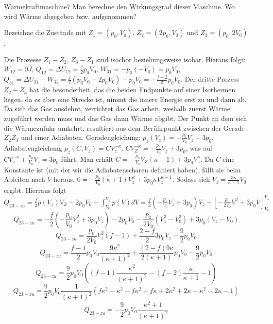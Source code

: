 \begin{problem}{Wärmekraftmaschine}{7}
Man berechne den Wirkungsgrad dieser Maschine. Wo wird Wärme abgegeben bzw. aufgenommen?
\begin{solution}
Bezeichne die Zustände mit $Z_1=(p_0,V_0)$, $Z_2=(2p_0,V_0)$ und $Z_3=(p_0,2V_0)$.



Die Prozesse $Z_1 - Z_2$, $Z_3 - Z_1$ sind isochor beziehungsweise isobar.
Hieraus folgt: $W_{12}=0J$, $Q_{12}=\Delta U_{12}=\frac f2 p_0V_0$, $W_{31}=-p_0(-V_0)=p_0V_0$, $Q_{31}=\Delta U_{31}-W_{31}=\frac f2 (p_0V_0-2p_0V_0)-p_0V_0=-\frac{f+2}2p_0V_0$.
Der dritte Prozess $Z_2-Z_3$ hat die besonderheit, das die beiden Endpunkte auf einer Isothermen liegen, da es aber eine Strecke ist, nimmt die innere Energie erst zu und dann ab.
Da sich das Gas ausdehnt, verrichtet das Gas arbeit, weshalb zuerst Wärme zugeführt werden muss und das Gas dann Wärme abgibt.
Der Punkt an dem sich die Wärmezufuhr umkehrt, resultiert aus dem Berührpunkt zwischen der Gerade $Z_2Z_3$ und einer Adiabaten.
Geradengleichung: $p_z(V_z)=-\frac{p_0}{V_0}V_z+3p_0$, Adiabatengleichung $p_z(C,V_z)=CV_z^{-\kappa}$. $CV_Z^{-\kappa}=-\frac{p_0}{V_0}V_z+3p_0$, was auf $CV_{z}^{-\kappa}+\frac{p_0}{V_0}V_z=3p_0$ führt.
Man erhält $C=-\frac{p_0}{V_0}V_Z(\kappa+1)+3p_0V_z^{\kappa}$.
Da $C$ eine Konstante ist (mit der wir die Adiabatenscharen definiert haben), fällt sie beim Ableiten nach $V$ heraus.
$0=-\frac{p_0}{V_0}(\kappa+1)V_z^{\kappa}+3p_0\kappa V_z^{\kappa -1}$.
Sodass sich $V_z=\frac{3\kappa}{\kappa+1}V_0$ ergibt.
Hierraus folgt $Q_{23-zu}=\frac f2 p(V_z)V_Z-2p_0V_0+\int_{V_0}^{V_z}p(V)dV=\frac f2 (-\frac{p_0}{V_0}V_z+3p_0)V_z+[-\frac{p_0}{2V_0}V^2+3p_0V]_{V_0}^{V_z}$
$$Q_{23-zu}=-\frac f2(-\frac{p_0}{V_0}V_z^2+3p_0V_z)-2p_0V_0-\frac{p_0}{2V_0}(V_z^2-V_0^2)+3p_0(V_z-V_0)$$
$$Q_{23-zu}=\frac{p_0}{2V_0}V_z^2(f-1)+\frac {2-f}2 3p_0V_z-\frac 92 p_0V_0$$
$$Q_{23-zu}=\frac{f-1}{2}p_0V_0\frac{9\kappa^2}{(\kappa+1)^2}+\frac {(2-f)9\kappa}{2(\kappa+1)} p_0V_0-\frac 92 p_0V_0$$
$$Q_{23-zu}=\frac 92 p_0V_0((f-1)\frac{\kappa^2}{(\kappa+1)^2}-(f-2)\frac{\kappa}{\kappa +1}-1)$$
$$Q_{23-zu}=\frac 92 p_0V_0\frac1{(\kappa+1)^2}(f\kappa^2-\kappa^2-f\kappa^2-f\kappa+2\kappa^2+2\kappa-\kappa^2-2\kappa - 1)$$
$$Q_{23-zu}=-\frac 92 p_0V_0\frac{\kappa^2+1}{(\kappa+1)^2}$$


\end{solution}
\end{problem}
